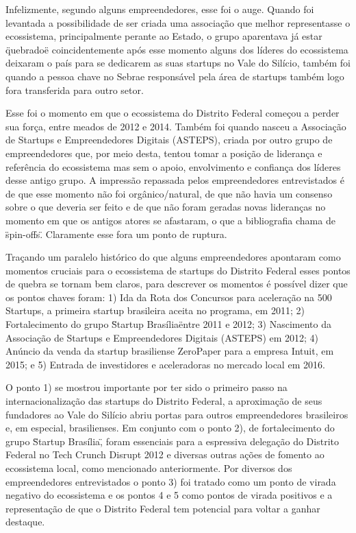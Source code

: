 Infelizmente, segundo alguns empreendedores, esse foi o auge. Quando foi levantada a possibilidade de ser criada uma associação que melhor representasse o ecossistema, principalmente perante ao Estado, o grupo aparentava já estar \"quebrado\" e coincidentemente após esse momento alguns dos líderes do ecossistema deixaram o país para se dedicarem as suas startups no Vale do Silício, também foi quando a pessoa chave no Sebrae responsável pela área de startups também logo fora transferida para outro setor. 

Esse foi o momento em que o ecossistema do Distrito Federal começou a perder sua força, entre meados de 2012 e 2014. Também foi quando nasceu a Associação de Startups e Empreendedores Digitais (ASTEPS), criada por outro grupo de empreendedores que, por meio desta, tentou tomar a posição de liderança e referência do ecossistema mas sem o apoio, envolvimento e confiança dos líderes desse antigo grupo. A impressão repassada pelos empreendedores entrevistados é de que esse momento não foi orgânico/natural, de que não havia um consenso sobre o que deveria ser feito e de que não foram geradas novas lideranças no momento em que os antigos atores se afastaram, o que a bibliografia chama de \"spin-offs\". Claramente esse fora um ponto de ruptura.

Traçando um paralelo histórico do que alguns empreendedores apontaram como momentos cruciais para o ecossistema de startups do Distrito Federal esses pontos de quebra se tornam bem claros, para descrever os momentos é possível dizer que os pontos chaves foram: 1) Ida da Rota dos Concursos para aceleração na 500 Startups, a primeira startup brasileira aceita no programa, em 2011; 2) Fortalecimento do grupo \"Startup Brasília\" entre 2011 e 2012; 3) Nascimento da Associação de Startups e Empreendedores Digitais (ASTEPS) em 2012; 4) Anúncio da venda da startup brasiliense ZeroPaper para a empresa Intuit, em 2015; e 5) Entrada de investidores e aceleradoras no mercado local em 2016. 

O ponto 1) se mostrou importante por ter sido o primeiro passo na internacionalização das startups do Distrito Federal, a aproximação de seus fundadores ao Vale do Silício abriu portas para outros empreendedores brasileiros e, em especial, brasilienses. Em conjunto com o ponto 2), de fortalecimento do grupo \"Startup Brasília\", foram essenciais para a espressiva delegação do Distrito Federal no Tech Crunch Disrupt 2012 e diversas outras ações de fomento ao ecossistema local, como mencionado anteriormente. Por diversos dos empreendedores entrevistados o ponto 3) foi tratado como um ponto de virada negativo do ecossistema e os pontos 4 e 5 como pontos de virada positivos e a representação de que o Distrito Federal tem potencial para voltar a ganhar destaque. 

